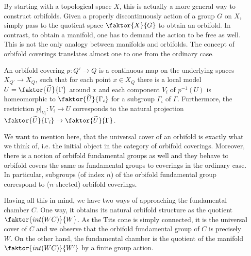 By starting with a topological space \(X\), this is actually a more general way to construct orbifolds.
Given a properly discontinuously action of a group \(G\) on \(X\), simply pass to the quotient space \(\faktor{X}{G}\) to obtain an orbifold.
In contrast, to obtain a manifold, one has to demand the action to be free as well.
This is not the only analogy between manifolds and orbifolds.
The concept of orbifold coverings translates almost one to one from the ordinary case.

\begin{definition}
    An orbifold covering \(p: Q' \to Q\) is a continuous map on the underlying spaces \(X_{Q'} \to X_Q\), such that for each point \(x \in X_Q\) there is a local model \(U = \faktor{\widetilde{U}}{\Gamma}\) around \(x\) and each component \(V_i\) of \(p^{-1}(U)\) is homeomorphic to \(\faktor{\widetilde{U}}{\Gamma_i}\) for a subgroup \(\Gamma_i\) of \(\Gamma\).
    Furthermore, the restriction \(p\vert_{V_i} : V_i \to U\) corresponds to the natural projection \(\faktor{\widetilde{U}}{\Gamma_i} \to \faktor{\widetilde{U}}{\Gamma}\).
\end{definition}

\begin{remark}\label{rmk:covers}
    We want to mention here, that the universal cover of an orbifold is exactly what we think of, i.e. the initial object in the category of orbifold coverings.
    Moreover, there is a notion of orbifold fundamental groups as well and they behave to orbifold covers the same as fundamental groups to coverings in the ordinary case.
    In particular, subgroups (of index \(n\)) of the orbifold fundamental group correspond to (\(n\)-sheeted) orbifold coverings.
\end{remark}
    
Having all this in mind, we have two ways of approaching the fundamental chamber \(C\).
One way, it obtains its natural orbifold structure as the quotient \(\faktor{int(WC)}{W}\).
As the Tits cone is simply connected, it is the universal cover of \(C\) and we observe that the orbifold fundamental group of \(C\) is precisely \(W\).
On the other hand, the fundamental chamber is the quotient of the manifold \(\faktor{int(WC)}{W'}\) by a finite group action.
\vspace*{\parskip}

